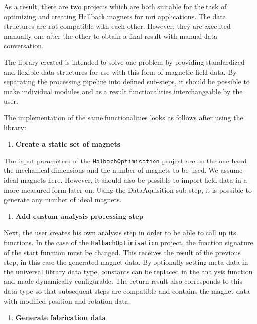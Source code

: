 As a result, there are two projects which are both suitable for the task
of optimizing and creating Hallbach magnets for \gls{mri} applications.
The data structures are not compatible with each other. However, they
are executed manually one after the other to obtain a final result with
manual data conversation.

The library created is intended to solve one problem by providing
standardized and flexible data structures for use with this form of
magnetic field data. By separating the processing pipeline into defined
sub-steps, it should be possible to make individual modules and as a
result functionalities interchangeable by the user.

The implementation of the same functionalities looks as follows after
using the library:

\begin{enumerate}
\def\labelenumi{\arabic{enumi}.}
\tightlist
\item
  \textbf{Create a static set of magnets}
\end{enumerate}

The input parameters of the
\passthrough{\lstinline!HalbachOptimisation!}
\cite{HalbachOptimisation} project are on the one hand the
mechanical dimensions and the number of magnets to be used. We assume
ideal magnets here. However, it should also be possible to import field
data in a more measured form later on. Using the DataAquisition
sub-step, it is possible to generate any number of ideal magnets.

\begin{enumerate}
\def\labelenumi{\arabic{enumi}.}
\setcounter{enumi}{1}
\tightlist
\item
  \textbf{Add custom analysis processing step}
\end{enumerate}

Next, the user creates his own analysis step in order to be able to call
up its functions. In the case of the
\passthrough{\lstinline!HalbachOptimisation!}
\cite{HalbachOptimisation} project, the function signature of the
start function must be changed. This receives the result of the previous
step, in this case the generated magnet data. By optionally setting meta
data in the universal library data type, constants can be replaced in
the analysis function and made dynamically configurable. The return
result also corresponds to this data type so that subsequent steps are
compatible and contains the magnet data with modified position and
rotation data.

\begin{enumerate}
\def\labelenumi{\arabic{enumi}.}
\setcounter{enumi}{2}
\tightlist
\item
  \textbf{Generate fabrication data}
\end{enumerate}


